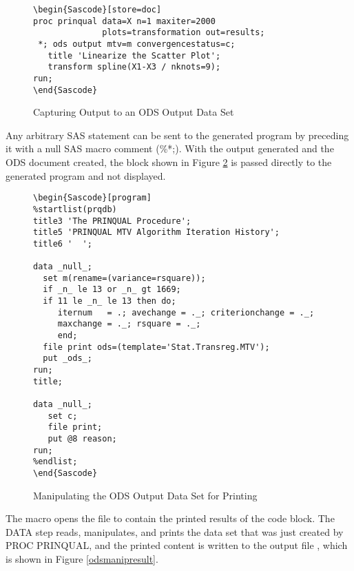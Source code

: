 \documentclass[article,oneside]{memoir}
\begin{document}
\begin{figure}[H]
\begin{snugshade}
\begin{verbatim}
\begin{Sascode}[store=doc]
proc prinqual data=X n=1 maxiter=2000
              plots=transformation out=results;
 *; ods output mtv=m convergencestatus=c;
   title 'Linearize the Scatter Plot';
   transform spline(X1-X3 / nknots=9);
run;
\end{Sascode}
\end{verbatim}
\end{snugshade}
\caption{Capturing Output to an ODS Output Data Set}\label{odsdataset}
\end{figure}

  Any arbitrary SAS statement can be sent to the generated program by preceding
  it with a null SAS macro comment (\%*;).
  With the output generated and the ODS document  created,
  the  block shown in Figure \ref{odsmanip} is passed directly
  to the generated program and not displayed.

\begin{figure}[H]
\begin{snugshade}
\begin{verbatim}
\begin{Sascode}[program]
%startlist(prqdb)
title3 'The PRINQUAL Procedure';
title5 'PRINQUAL MTV Algorithm Iteration History';
title6 '  ';

data _null_;
  set m(rename=(variance=rsquare));
  if _n_ le 13 or _n_ gt 1669;
  if 11 le _n_ le 13 then do;
     iternum   = .; avechange = ._; criterionchange = ._;
     maxchange = ._; rsquare = ._;
     end;
  file print ods=(template='Stat.Transreg.MTV');
  put _ods_;
run;
title;

data _null_;
   set c;
   file print;
   put @8 reason;
run;
%endlist;
\end{Sascode}
\end{verbatim}
\end{snugshade}
\caption{Manipulating the ODS Output Data Set for Printing}\label{odsmanip}
\end{figure}

  The  macro opens the file 
   to contain the printed results of the code block.
  The DATA step reads, manipulates, and prints the data set 
  that was just created by PROC PRINQUAL, and the printed content is written to the
  output file , which is shown in Figure \ref{odsmanipresult}.
\end{document}
